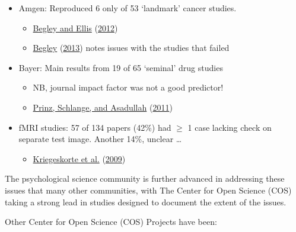 \documentclass[
  10pt,
  b5paper]{book}
\providecommand{\tightlist}{%
  \setlength{\itemsep}{0pt}\setlength{\parskip}{0pt}}
\begin{document}
\begin{itemize}
\tightlist
\item
  Amgen: Reproduced 6 only of 53 `landmark' cancer studies.

  \begin{itemize}
  \tightlist
  \item
    \protect\hyperlink{ref-r23_begley_ellis_2012}{Begley and Ellis} (\protect\hyperlink{ref-r23_begley_ellis_2012}{2012})
  \item
    \protect\hyperlink{ref-r2_begley_2013}{Begley} (\protect\hyperlink{ref-r2_begley_2013}{2013}) notes issues with the studies that failed
  \end{itemize}
\item
  Bayer: Main results from 19 of 65 `seminal' drug studies

  \begin{itemize}
  \tightlist
  \item
    NB, journal impact factor was not a good predictor!
  \item
    \protect\hyperlink{ref-r9_prinz_schlange_asadullah_2011}{Prinz, Schlange, and Asadullah} (\protect\hyperlink{ref-r9_prinz_schlange_asadullah_2011}{2011})
  \end{itemize}
\item
  fMRI studies: 57 of 134 papers (42\%) had \(\geq\) 1 case lacking
  check on separate test image.
  Another 14\%, unclear \ldots{}

  \begin{itemize}
  \tightlist
  \item
    \protect\hyperlink{ref-r8_kriegeskorte_simmons_bellgowan_baker_2009}{Kriegeskorte et al.} (\protect\hyperlink{ref-r8_kriegeskorte_simmons_bellgowan_baker_2009}{2009})
  \end{itemize}
\end{itemize}

The psychological science community is further advanced in
addressing these issues that many other communities, with
The Center for Open Science (COS) taking a strong lead in
studies designed to document the extent of the issues.

Other Center for Open Science (COS) Projects have been:
\end{document}
